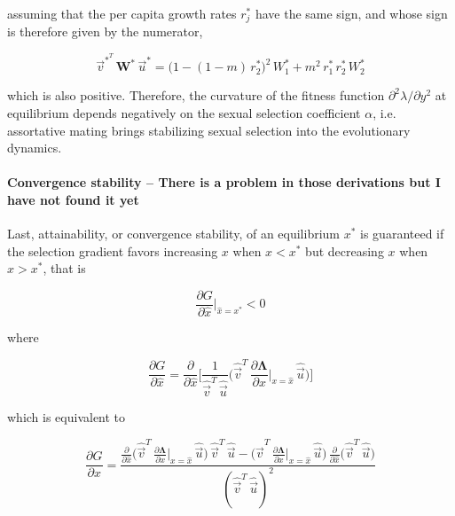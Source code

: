 assuming that the per capita growth rates $r^*_j$ have the same sign, and whose sign is therefore given by the numerator,

\begin{equation}
    \overrightarrow{v}^*^T\,\pmb W^*\,\overrightarrow{u}^* = \big(1-(1-m)\,r^*_2\big)^2\,W^*_1 + m^2\,r^*_1\,r^*_2\,W^*_2
\end{equation}

which is also positive. Therefore, the curvature of the fitness function $\partial^2 \lambda / \partial y^2$ at equilibrium depends negatively on the sexual selection coefficient $\alpha$, i.e. assortative mating brings stabilizing sexual selection into the evolutionary dynamics.

\paragraph{Convergence stability -- There is a problem in those derivations but I have not found it yet} Last, attainability, or convergence stability, of an equilibrium $x^*$ is guaranteed if the selection gradient favors increasing $x$ when $x < x^*$ but decreasing $x$ when $x > x^*$, that is

\begin{equation}
    \frac{\partial G}{\partial \hat{x}}\bigg|_{\hat{x}=x^*} < 0
\end{equation}

where 

\begin{equation}
    \frac{\partial G}{\partial \hat{x}} = \frac{\partial}{\partial \hat{x}} \Bigg[ \frac{1}{\hat{\overrightarrow{v}}^T\,\hat{\overrightarrow{u}}} \bigg( \hat{\overrightarrow{v}}^T\,\frac{\partial \pmb{\Lambda}}{\partial x}\bigg|_{x=\hat{x}}\,\hat{\overrightarrow{u}} \bigg) \Bigg]
\end{equation}

which is equivalent to

\begin{equation}
    \frac{\partial G}{\partial \hat{x}} = \frac{\frac{\partial}{\partial \hat{x}} \big( \hat{\overrightarrow{v}}^T\,\frac{\partial \pmb{\Lambda}}{\partial x}\big|_{x=\hat{x}}\,\hat{\overrightarrow{u}} \big)\,\hat{\overrightarrow{v}}^T\,\hat{\overrightarrow{u}} - \big( \hat{\overrightarrow{v}}^T\,\frac{\partial \pmb{\Lambda}}{\partial x}\big|_{x=\hat{x}}\,\hat{\overrightarrow{u}} \big)\,\frac{\partial}{\partial \hat{x}} \big(\hat{\overrightarrow{v}}^T\,\hat{\overrightarrow{u}}\big)}{(\hat{\overrightarrow{v}}^T\,\hat{\overrightarrow{u}})^2}
    \label{eq:deriv_gradient}
\end{equation}

